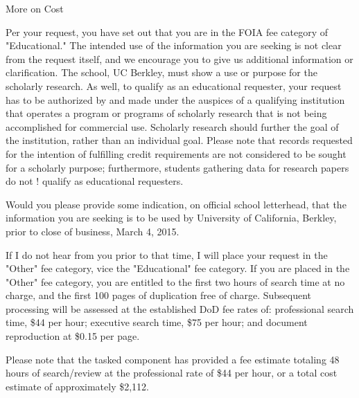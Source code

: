 \documentclass{beamer}
\begin{document}
\begin{frame}[label=More]{More on Cost}
\begin{small}
Per your request, you have set out that you are in the FOIA fee category of "Educational."  The intended use of the information you are seeking is not clear from the request itself, and we encourage you to give us additional information or clarification.  The school, UC Berkley, must show a use or purpose for the scholarly research.  As well, to qualify as an educational requester, your request has to be authorized by and made under the auspices of a qualifying institution that operates a program or programs of scholarly research that is not being accomplished for commercial use.  Scholarly research should further the goal of the institution, rather than an individual goal.  Please note that records requested for the intention of fulfilling credit requirements are not considered to be sought for a scholarly purpose; furthermore, students gathering data for research papers do not !
 qualify as educational requesters.

        Would you please provide some indication, on official school letterhead, that the information you are seeking is to be used by University of California, Berkley, prior to close of business, March 4, 2015.

        If I do not hear from you prior to that time, I will place your request in the "Other" fee category, vice the "Educational" fee category.  If you are placed in the "Other" fee category, you are entitled to the first two hours of search time at no charge, and the first 100 pages of duplication free of charge. Subsequent processing will be assessed at the established DoD fee rates of: professional search time, \$44 per hour; executive search time, \$75 per hour; and document reproduction at \$0.15 per page.

        Please note that the tasked component has provided a fee estimate totaling 48 hours of search/review at the professional rate of \$44 per hour, or a total cost estimate of approximately \$2,112.
        \hyperlink{back}{}
        \end{small}
\end{frame}
\end{document}
